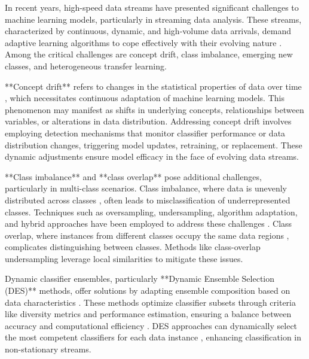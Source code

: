 In recent years, high-speed data streams have presented significant challenges to machine learning models, particularly in streaming data analysis. These streams, characterized by continuous, dynamic, and high-volume data arrivals, demand adaptive learning algorithms to cope effectively with their evolving nature \cite{yang2021concept, dong2019multistream, shan2018online}. Among the critical challenges are concept drift, class imbalance, emerging new classes, and heterogeneous transfer learning.  

**Concept drift** refers to changes in the statistical properties of data over time \cite{pan2009survey, zhuang2020comprehensive}, which necessitates continuous adaptation of machine learning models. This phenomenon may manifest as shifts in underlying concepts, relationships between variables, or alterations in data distribution. Addressing concept drift involves employing detection mechanisms that monitor classifier performance or data distribution changes, triggering model updates, retraining, or replacement. These dynamic adjustments ensure model efficacy in the face of evolving data streams.  

**Class imbalance** and **class overlap** pose additional challenges, particularly in multi-class scenarios. Class imbalance, where data is unevenly distributed across classes \cite{wang2018systematic, sun2009classification}, often leads to misclassification of underrepresented classes. Techniques such as oversampling, undersampling, algorithm adaptation, and hybrid approaches have been employed to address these challenges \cite{charte2015addressing, charte2015mlsmote, daniels2017addressing, liu2018making}. Class overlap, where instances from different classes occupy the same data regions \cite{bhowan2012evolving, galar2011review}, complicates distinguishing between classes. Methods like class-overlap undersampling leverage local similarities to mitigate these issues.  

Dynamic classifier ensembles, particularly **Dynamic Ensemble Selection (DES)** methods, offer solutions by adapting ensemble composition based on data characteristics \cite{cruz2018dynamic}. These methods optimize classifier subsets through criteria like diversity metrics and performance estimation, ensuring a balance between accuracy and computational efficiency \cite{kuncheva2000clustering}. DES approaches can dynamically select the most competent classifiers for each data instance \cite{woloszynski2011probabilistic, lysiak2014optimal, cruz2017meta}, enhancing classification in non-stationary streams.  

